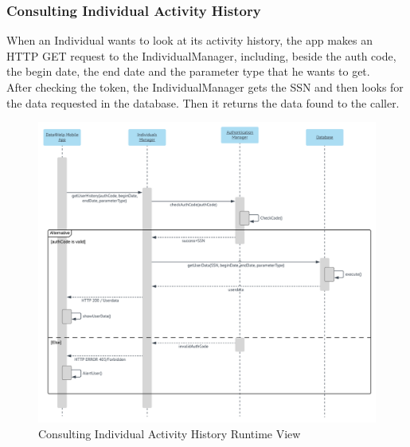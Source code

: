 \subsubsection{Consulting Individual Activity History}
When an Individual wants to look at its activity history, the app makes an HTTP GET request to the IndividualManager, including, beside the auth code, the begin date, the end date and the parameter type that he wants to get. \\
After checking the token, the IndividualManager gets the SSN and then looks for the data requested in the database. Then it returns the data found to the caller.
\begin{figure}[H]
	\includegraphics[width=\textwidth,height=\textheight,keepaspectratio]{assets/flowCharts/ConsultingIndividualActivityHistory.pdf}
	\caption{Consulting Individual Activity History Runtime View}
	\label{fig:ConsultingIndividualActivityHistory}
\end{figure}

